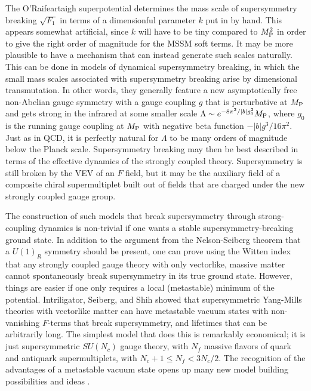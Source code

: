\documentclass[12pt]{article}
\def\MPlanck{M_{\rm P}}
\begin{document}
The O'Rai\-f\-ear\-taigh superpotential determines the mass scale of
supersymmetry breaking $\sqrt{F_1}$ in terms of a dimensionful parameter
$k$ put in by hand. This appears somewhat artificial, since $k$ will have
to be tiny compared to $\MPlanck^2$ in order to give the right order of
magnitude for the MSSM soft terms. It may be more plausible to have a mechanism that
can instead generate such scales naturally. This can be done in models of
dynamical supersymmetry breaking, in which the small 
mass scales associated with supersymmetry breaking arise by
dimensional transmutation. In other words, they generally feature a new
asymptotically free non-Abelian gauge symmetry with a gauge coupling $g$
that is perturbative at $\MPlanck$ and gets strong in the infrared at some
smaller scale $\Lambda \sim e^{-8\pi^2/|b| g_0^2} \MPlanck$, where $g_0$
is the running gauge coupling at $\MPlanck$ with negative beta function $-
|b| g^3/16 \pi^2$. Just as in QCD, it is perfectly natural for $\Lambda$
to be many orders of magnitude below the Planck scale. Supersymmetry
breaking may then be best described in terms of the effective dynamics of
the strongly coupled theory. 
Supersymmetry is still broken by the VEV of an $F$ field, but it may be
the auxiliary field of a composite chiral supermultiplet built out
of fields that are charged under the new strongly coupled gauge group.

The construction of such models that break supersymmetry through strong-coupling dynamics is 
non-trivial if one wants a stable supersymmetry-breaking ground state. In addition to the 
argument from the Nelson-Seiberg theorem that a $U(1)_R$ symmetry should be present, one can 
prove using the Witten index \cite{Wittenindex,AffleckDineSeiberg} that any strongly coupled 
gauge theory with only vectorlike, massive matter cannot spontaneously break supersymmetry in 
its true ground state. However, things are easier if one only requires a local (metastable) 
minimum of the potential. Intriligator, Seiberg, and Shih showed \cite{Intriligator:2006dd} that 
supersymmetric Yang-Mills theories with vectorlike matter can have metastable vacuum states with 
non-vanishing $F$-terms that break supersymmetry, and lifetimes that can be arbitrarily long. The 
simplest model that does this is remarkably economical; it is just supersymmetric $SU(N_c)$ gauge 
theory, with $N_f$ massive flavors of quark and antiquark supermultiplets, with $N_c + 1 \leq N_f 
< 3 N_c/2$. The recognition of the advantages of a metastable vacuum state 
opens up many new model building possibilities and ideas 
\cite{Intriligator:2006dd,Intriligator:2007py,metastablemodels}.
\end{document}
